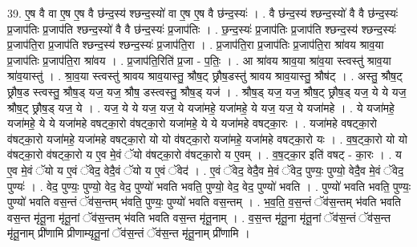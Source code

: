 \documentclass[17pt]{extarticle}
\begin{document}
39. ए॒ष वै वा ए॒ष ए॒ष वै छ॑न्द॒स्य॑ श्छन्द॒स्यो॑ वा ए॒ष ए॒ष वै छ॑न्द॒स्यः॑ । . वै छ॑न्द॒स्य॑ श्छन्द॒स्यो॑ वै वै छ॑न्द॒स्यः॑ प्र॒जाप॑तिः प्र॒जाप॑ति श्छन्द॒स्यो॑ वै वै छ॑न्द॒स्यः॑ प्र॒जाप॑तिः । . छ॒न्द॒स्यः॑ प्र॒जाप॑तिः प्र॒जाप॑ति श्छन्द॒स्य॑ श्छन्द॒स्यः॑ प्र॒जाप॑ति॒रा प्र॒जाप॑ति श्छन्द॒स्य॑ श्छन्द॒स्यः॑ प्र॒जाप॑ति॒रा । . प्र॒जाप॑ति॒रा प्र॒जाप॑तिः प्र॒जाप॑ति॒रा श्रा॑वय श्राव॒या प्र॒जाप॑तिः प्र॒जाप॑ति॒रा श्रा॑वय । . प्र॒जाप॑ति॒रिति॑ प्र॒जा - प॒तिः॒ । . आ श्रा॑वय श्राव॒या श्रा॑व॒या स्त्वस्तु॑ श्राव॒या श्रा॑व॒यास्तु॑ । . श्रा॒व॒या स्त्वस्तु॑ श्रावय श्राव॒यास्तु॒ श्रौष॒ट् छ्रौष॒डस्तु॑ श्रावय श्राव॒यास्तु॒ श्रौष॑ट् । . अस्तु॒ श्रौष॒ट् छ्रौष॒ड स्त्वस्तु॒ श्रौष॒ड् यज॒ यज॒ श्रौष॒ डस्त्वस्तु॒ श्रौष॒ड् यज॑ । . श्रौष॒ड् यज॒ यज॒ श्रौष॒ट् छ्रौष॒ड् यज॒ ये ये यज॒ श्रौष॒ट् छ्रौष॒ड् यज॒ ये । . यज॒ ये ये यज॒ यज॒ ये यजा॑महे॒ यजा॑महे॒ ये यज॒ यज॒ ये यजा॑महे । . ये यजा॑महे॒ यजा॑महे॒ ये ये यजा॑महे वषट्का॒रो व॑षट्का॒रो यजा॑महे॒ ये ये यजा॑महे वषट्का॒रः । . यजा॑महे वषट्का॒रो व॑षट्का॒रो यजा॑महे॒ यजा॑महे वषट्का॒रो यो यो व॑षट्का॒रो यजा॑महे॒ यजा॑महे वषट्का॒रो यः । . व॒ष॒ट्का॒रो यो यो व॑षट्का॒रो व॑षट्का॒रो य ए॒व मे॒वं ॅयो व॑षट्का॒रो व॑षट्का॒रो य ए॒वम् । . व॒ष॒ट्का॒र इति॑ वषट् - का॒रः । . य ए॒व मे॒वं ॅयो य ए॒वं ॅवेद॒ वेदै॒वं ॅयो य ए॒वं ॅवेद॑ । . ए॒वं ॅवेद॒ वेदै॒व मे॒वं ॅवेद॒ पुण्यः॒ पुण्यो॒ वेदै॒व मे॒वं ॅवेद॒ पुण्यः॑ । . वेद॒ पुण्यः॒ पुण्यो॒ वेद॒ वेद॒ पुण्यो॑ भवति भवति॒ पुण्यो॒ वेद॒ वेद॒ पुण्यो॑ भवति । . पुण्यो॑ भवति भवति॒ पुण्यः॒ पुण्यो॑ भवति वस॒न्तं ॅव॑स॒न्तम् भ॑वति॒ पुण्यः॒ पुण्यो॑ भवति वस॒न्तम् । . भ॒व॒ति॒ व॒स॒न्तं ॅव॑स॒न्तम् भ॑वति भवति वस॒न्त मृ॑तू॒ना मृ॑तू॒नां ॅव॑स॒न्तम् भ॑वति भवति वस॒न्त मृ॑तू॒नाम् । . व॒स॒न्त मृ॑तू॒ना मृ॑तू॒नां ॅव॑स॒न्तं ॅव॑स॒न्त मृ॑तू॒नाम् प्री॑णामि प्रीणाम्यृतू॒नां ॅव॑स॒न्तं ॅव॑स॒न्त मृ॑तू॒नाम् प्री॑णामि । \newline
\pagebreak
{}
\end{document}
